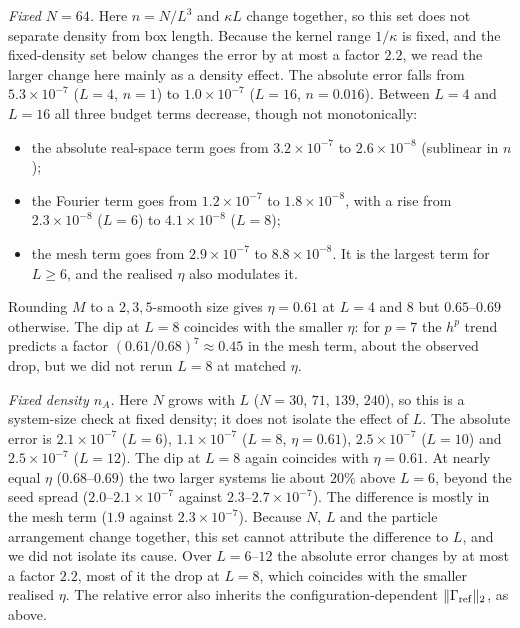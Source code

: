 \emph{Fixed $N=64$.} Here $n=N/L^3$ and $\kappa L$ change together, so this set does not separate density from box
length. Because the kernel range $1/\kappa$ is fixed, and the fixed-density set below changes the error by at most a
factor $2.2$, we read the larger change here mainly as a density effect. The absolute error falls from $5.3\times10^{-7}$ ($L=4$, $n=1$) to
$1.0\times10^{-7}$ ($L=16$, $n=0.016$). Between $L=4$ and $L=16$ all three budget terms decrease, though not
monotonically:
\begin{itemize}
\item the absolute real-space term goes from $3.2\times10^{-7}$ to $2.6\times10^{-8}$ (sublinear in $n$);
\item the Fourier term goes from $1.2\times10^{-7}$ to $1.8\times10^{-8}$, with a rise from $2.3\times10^{-8}$ ($L=6$) to
  $4.1\times10^{-8}$ ($L=8$);
\item the mesh term goes from $2.9\times10^{-7}$ to $8.8\times10^{-8}$. It is the largest term for $L\ge6$, and the
  realised $\eta$ also modulates it.
\end{itemize}
Rounding $M$ to a $2,3,5$-smooth size gives $\eta=0.61$ at $L=4$ and $8$ but $0.65$--$0.69$ otherwise. The dip at
$L=8$ coincides with the smaller $\eta$: for $p=7$ the $h^p$ trend predicts a factor $(0.61/0.68)^7\approx0.45$ in the
mesh term, about the observed drop, but we did not rerun $L=8$ at matched $\eta$.

\emph{Fixed density $n_A$.} Here $N$ grows with $L$ ($N=30$, $71$, $139$, $240$), so this is a system-size check at
fixed density; it does not isolate the effect of $L$. The absolute error is $2.1\times10^{-7}$ ($L=6$),
$1.1\times10^{-7}$ ($L=8$, $\eta=0.61$), $2.5\times10^{-7}$ ($L=10$) and $2.5\times10^{-7}$ ($L=12$). The dip at $L=8$
again coincides with $\eta=0.61$. At nearly equal $\eta$ ($0.68$--$0.69$) the two larger systems lie about $20\%$ above $L=6$,
beyond the seed spread ($2.0$--$2.1\times10^{-7}$ against $2.3$--$2.7\times10^{-7}$). The difference is mostly in the mesh
term ($1.9$ against $2.3\times10^{-7}$). Because $N$, $L$ and the particle arrangement change together, this set cannot
attribute the difference to $L$, and we did not isolate its cause. Over $L=6$--$12$ the absolute error changes by at
most a factor $2.2$, most of it the drop at $L=8$, which coincides with the smaller realised $\eta$. The relative error also inherits the
configuration-dependent $\|\Gamma_{\rm ref}\|_2$, as above.

